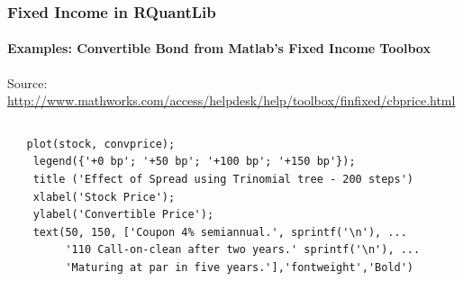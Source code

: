 \documentclass[compress]{beamer}
\begin{document}
\begin{frame}[fragile]
	\frametitle{Fixed Income in RQuantLib}
	\framesubtitle{Examples: Convertible Bond from Matlab's Fixed Income Toolbox}	
\tiny
Source: \url{http://www.mathworks.com/access/helpdesk/help/toolbox/finfixed/cbprice.html}
 \begin{columns}
 \column{1.5in}
\lstset{language=Matlab,basicstyle=\tiny}
	\begin{lstlisting}
   plot(stock, convprice);
    legend({'+0 bp'; '+50 bp'; '+100 bp'; '+150 bp'});
    title ('Effect of Spread using Trinomial tree - 200 steps')
    xlabel('Stock Price');
    ylabel('Convertible Price');
    text(50, 150, ['Coupon 4% semiannual.', sprintf('\n'), ...
         '110 Call-on-clean after two years.' sprintf('\n'), ...
         'Maturing at par in five years.'],'fontweight','Bold')
 	\end{lstlisting}
 	
  \column{2.8in}
\begin{center}
\end{center}
\end{columns}
\end{frame}
\end{document}
